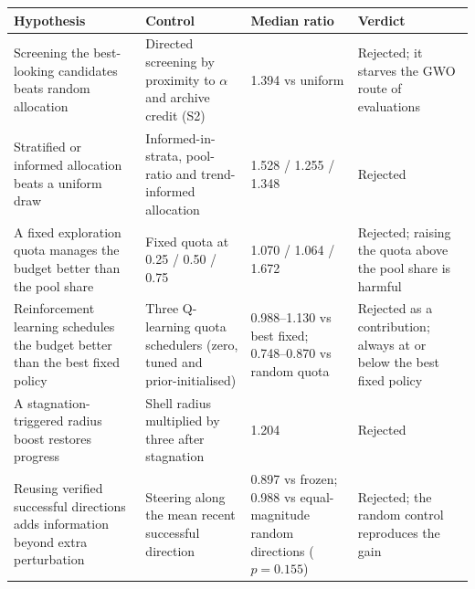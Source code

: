 \begin{tabular}{p{4.6cm}p{4.2cm}p{2.6cm}p{4.0cm}}
\toprule
Hypothesis & Control & Median ratio & Verdict \\
\midrule
Screening the best-looking candidates beats random allocation & Directed screening by proximity to $\alpha$ and archive credit (S2) & 1.394 vs uniform & Rejected; it starves the GWO route of evaluations \\
Stratified or informed allocation beats a uniform draw & Informed-in-strata, pool-ratio and trend-informed allocation & 1.528 / 1.255 / 1.348 & Rejected \\
A fixed exploration quota manages the budget better than the pool share & Fixed quota at 0.25 / 0.50 / 0.75 & 1.070 / 1.064 / 1.672 & Rejected; raising the quota above the pool share is harmful \\
Reinforcement learning schedules the budget better than the best fixed policy & Three Q-learning quota schedulers (zero, tuned and prior-initialised) & 0.988--1.130 vs best fixed; 0.748--0.870 vs random quota & Rejected as a contribution; always at or below the best fixed policy \\
A stagnation-triggered radius boost restores progress & Shell radius multiplied by three after stagnation & 1.204 & Rejected \\
Reusing verified successful directions adds information beyond extra perturbation & Steering along the mean recent successful direction & 0.897 vs frozen; 0.988 vs equal-magnitude random directions ($p=0.155$) & Rejected; the random control reproduces the gain \\
\bottomrule
\end{tabular}
